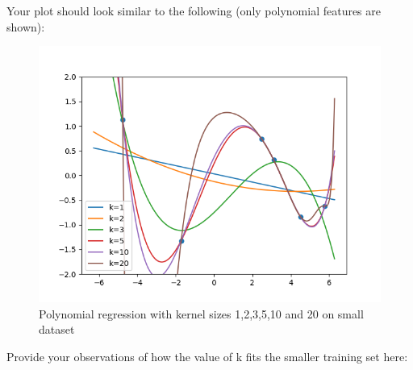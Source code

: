 Your plot should look similar to the following (only polynomial features are shown):
\begin{figure}[H]
  \centering
  \includegraphics[width=0.65\linewidth]{featuremaps/src/small-poly.png}
  \caption{Polynomial regression with kernel sizes 1,2,3,5,10 and 20
  on small dataset}
\end{figure}

Provide your observations of how the value of k fits the smaller training set here:\\[50pt]